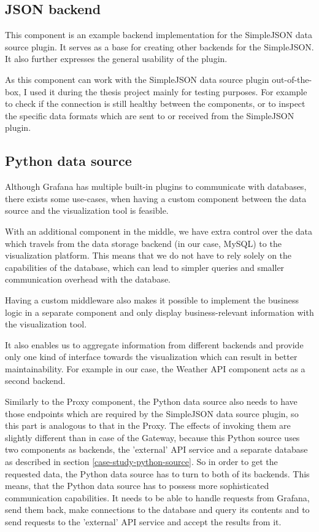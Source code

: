 \subsection{JSON backend}
This component is an example backend implementation for the SimpleJSON data source plugin. It serves as a base for creating other backends for the SimpleJSON. It also further expresses the general usability of the plugin. \cite{fake-simple-json-datasource}

As this component can work with the SimpleJSON data source plugin out-of-the-box, I used it during the thesis project mainly for testing purposes. For example to check if the connection is still healthy between the components, or to inspect the specific data formats which are sent to or received from the SimpleJSON plugin.

\subsection{Python data source}

Although Grafana has multiple built-in plugins to communicate with databases, there exists some use-cases, when having a custom component between the data source and the visualization tool is feasible.

With an additional component in the middle, we have extra control over the data which travels from the data storage backend (in our case, MySQL) to the visualization platform. This means that we do not have to rely solely on the capabilities of the database, which can lead to simpler queries and smaller communication overhead with the database.

Having a custom middleware also makes it possible to implement the business logic in a separate component and only display business-relevant information with the visualization tool.

It also enables us to aggregate information from different backends and provide only one kind of interface towards the visualization which can result in better maintainability. For example in our case, the Weather API component acts as a second backend.

Similarly to the Proxy component, the Python data source also needs to have those endpoints which are required by the SimpleJSON data source plugin, so this part is analogous to that in the Proxy. The effects of invoking them are slightly different than in case of the Gateway, because this Python source uses two components as backends, the 'external' API service and a separate database as described in section \ref{case-study-python-source}. So in order to get the requested data, the Python data source has to turn to both of its backends. This means, that the Python data source has to possess more sophisticated communication capabilities. It needs to be able to handle requests from Grafana, send them back, make connections to the database and query its contents and to send requests to the 'external' API service and accept the results from it.


